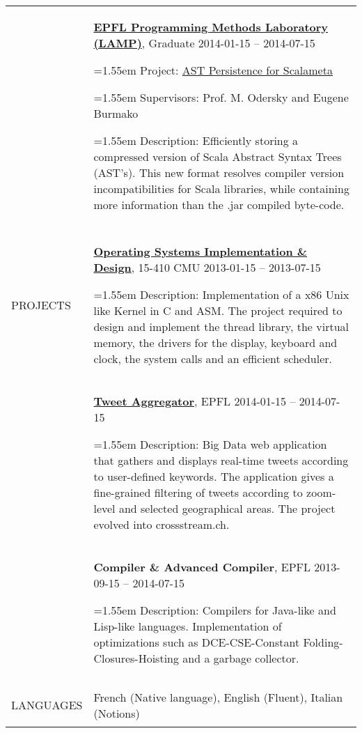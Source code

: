 \documentclass[a4paper,10pt,oneside]{article}
\newcommand{\BulletSymbol}{{\char"2022}}
\newcommand{\LongMonth}[1]{%
\ifcase#1\relax
\or January%
\or February%
\or March%
\or April%
\or May%
\or June%
\or July%
\or August%
\or September%
\or October%
\or November%
\or December%
\fi}
\newcommand{\ShortMonth}[1]{%
\ifcase#1\relax
\or Jan%
\or Feb%
\or Mar%
\or Apr%
\or May%
\or Jun%
\or Jul%
\or Aug%
\or Sep%
\or Oct%
\or Nov%
\or Dec%
\fi}
\newcommand{\DatestampYMD}[3]{\mbox{#1-#2-#3}}
\newcommand{\DatestampYMD}[3]{\mbox{\ShortMonth{#2} #1}}
\newcommand{\DatestampYMD}[3]{\mbox{\LongMonth{#2} #1}}
\newcommand{\DatestampYMD}[3]{#1}
\newenvironment{body}
{\par\vspace{-1em}\par
\begin{longtable}{p{0.15\textwidth}p{0.80\textwidth}}}
{\par\end{longtable}\par}
\renewcommand{\section}[3]{\\[-1em]\pdfbookmark[2]{#2}{#3}\\%
{\fontsize{9pt}{11pt}\selectfont\bfseries\raggedright%
\MakeUppercase{#1}}&}
\newcommand{\EntryGap}{\\[-0.5em]~&}
\newenvironment{detail}
{\par\begingroup\fontsize{8.6}{10.3}\selectfont}
{\par\endgroup\par}
\newcommand{\BulletItem}{\par%
\noindent\hangafter=1\hangindent=1.55em\ignorespaces%
\hspace{0.8em}\BulletSymbol\hspace{0.4em}\ignorespaces}
\begin{document}
\begin{body}
\EntryGap
\href{http://lamp.epfl.ch/}
{\textbf{EPFL Programming Methods Laboratory (LAMP)}},
Graduate
\hfill
\DatestampYMD{2014}{01}{15} --
\DatestampYMD{2014}{07}{15}
\begin{detail}
\BulletItem
Project:
\href{http://infoscience.epfl.ch/record/200050?ln=en}
{AST Persistence for Scalameta}
\BulletItem
Supervisors:
Prof. M. Odersky and 
Eugene Burmako
\BulletItem
Description:
Efficiently storing a compressed version of Scala Abstract Syntax Trees (AST's).
This new format resolves compiler version incompatibilities for Scala libraries, while containing more information than the .jar compiled byte-code.
\end{detail}


\section
{PROJECTS}
{Projects}
{PDF:Projects}

\href{https://www.cs.cmu.edu/~410/}
{\textbf{Operating Systems Implementation \& Design}}, 15-410 CMU
\hfill
\DatestampYMD{2013}{01}{15} --
\DatestampYMD{2013}{07}{15}
\begin{detail}
\BulletItem
Description:
Implementation of a x86 Unix like Kernel in C and ASM. The project required to design and implement the thread library, the virtual memory, the drivers for the display, keyboard and clock, the system calls and an efficient scheduler.
\end{detail}

\EntryGap
\href{http://crossstream.ch/}
{\textbf{Tweet Aggregator}}, EPFL
\hfill
\DatestampYMD{2014}{01}{15} --
\DatestampYMD{2014}{07}{15}
\begin{detail}
\BulletItem
Description:
Big Data web application that gathers and displays real-time tweets according to user-defined keywords.
The application gives a fine-grained filtering of tweets according to zoom-level and selected geographical areas. The project evolved into crossstream.ch.
\end{detail}

\EntryGap
\textbf{Compiler \& Advanced Compiler}, EPFL
\hfill
\DatestampYMD{2013}{09}{15} --
\DatestampYMD{2014}{07}{15}
\begin{detail}
\BulletItem
Description:
Compilers for Java-like and Lisp-like languages. Implementation of optimizations such as DCE-CSE-Constant Folding-Closures-Hoisting and a garbage collector.
\end{detail}

\hline

\section
{Languages}
{Languages}
{PDF:Languages}

French (Native language), English (Fluent), Italian (Notions)
\end{body}

\end{document}
